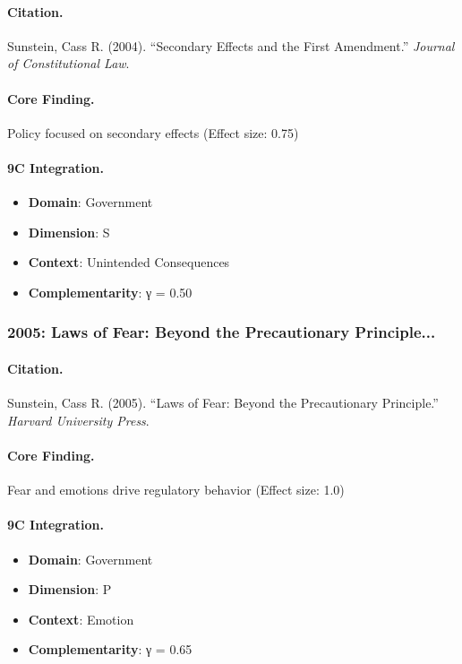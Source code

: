 \paragraph{Citation.}
Sunstein, Cass R. (2004). ``Secondary Effects and the First Amendment.''
\textit{Journal of Constitutional Law}.

\paragraph{Core Finding.}
Policy focused on secondary effects (Effect size: 0.75)

\paragraph{9C Integration.}
\begin{itemize}[nosep]
  \item \textbf{Domain}: Government
  \item \textbf{Dimension}: S
  \item \textbf{Context}: Unintended Consequences
  \item \textbf{Complementarity}: γ = 0.50
\end{itemize}

\subsubsection{2005: Laws of Fear: Beyond the Precautionary Principle...}

\paragraph{Citation.}
Sunstein, Cass R. (2005). ``Laws of Fear: Beyond the Precautionary Principle.''
\textit{Harvard University Press}.

\paragraph{Core Finding.}
Fear and emotions drive regulatory behavior (Effect size: 1.0)

\paragraph{9C Integration.}
\begin{itemize}[nosep]
  \item \textbf{Domain}: Government
  \item \textbf{Dimension}: P
  \item \textbf{Context}: Emotion
  \item \textbf{Complementarity}: γ = 0.65
\end{itemize}

